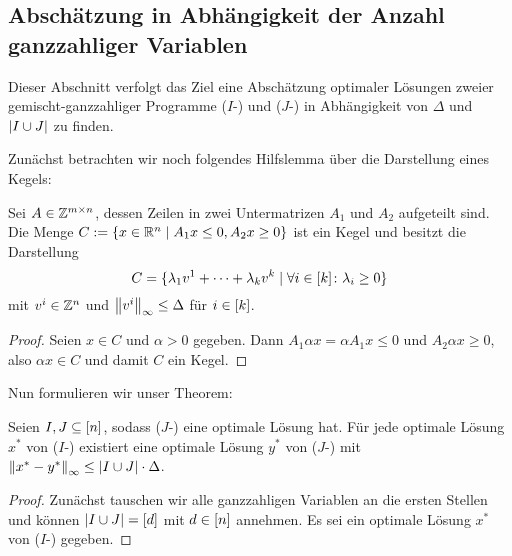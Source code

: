 \subsection{Abschätzung in Abhängigkeit der Anzahl ganzzahliger Variablen}
Dieser Abschnitt verfolgt das Ziel eine Abschätzung optimaler Lösungen zweier gemischt-ganzzahliger Programme	($I$-\MIP) und ($J$-\MIP) in Abhängigkeit von $\Delta$ und $\lvert I\cup J \rvert$ zu finden.

Zunächst betrachten wir noch folgendes Hilfslemma über die Darstellung eines Kegels:
\begin{lemma}
	Sei $A\in\mathbb{Z}^{m\times n}$, dessen Zeilen in zwei Untermatrizen $A_1$ und $A_2$ aufgeteilt sind.
	Die Menge $C:=\{ x\in\mathbb{R}^n \mid A_1x\leq 0, A_2x\geq0 \}$ ist ein Kegel und besitzt die Darstellung \[ C=\{\lambda_1 v^1+\dots+\lambda_kv^k \mid \forall i\in[k] \colon\lambda_i\geq0 \}\] mit $v^i\in\mathbb{Z}^n$ und $\left\lVert v^i\right\rVert_\infty\leq\Delta$ für $i\in[k]$.
\end{lemma}
\begin{proof}
	Seien $x\in C$ und $\alpha>0$ gegeben.
	Dann $A_1 \alpha x=\alpha A_1 x\leq 0$ und $A_2\alpha x\geq0$, also $\alpha x\in C$ und damit $C$ ein Kegel.
	
\end{proof}

Nun formulieren wir unser Theorem:

\begin{theorem}
	Seien $I,J\subseteq[n]$, sodass ($J$-\MIP) eine optimale Lösung hat.
	Für jede optimale Lösung $x^*$ von ($I$-\MIP) existiert eine optimale Lösung $y^*$ von ($J$-\MIP) mit $\left\lVert x^*-y^*\right\rVert_\infty\leq\lvert I\cup J \rvert\cdot\Delta$.
\end{theorem}
\begin{proof}
	Zunächst tauschen wir alle ganzzahligen Variablen an die ersten Stellen und können $\lvert I\cup J \rvert=[d]$ mit $d\in[n]$ annehmen.
	Es sei ein optimale Lösung $x^*$ von ($I$-\MIP) gegeben.
	
\end{proof}
